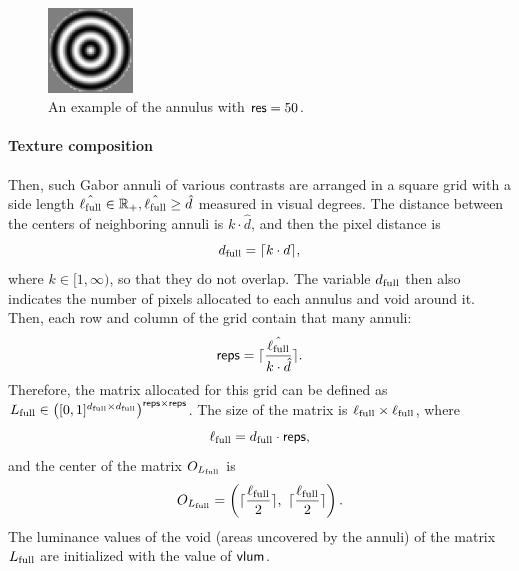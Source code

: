 \begin{figure}[!htp]
    \centering
    \includegraphics[width=0.2\textwidth]{assets/images/grating.png}
    \caption{An example of the annulus with $\mathsf{res} = 50$.}
    \label{fig:grating-example}
\end{figure}


\paragraph{Texture composition}

Then, such Gabor annuli of various contrasts are arranged in a square grid with a side length $\hat{\ell_{\mathrm{full}}} \in \mathbb{R}_+, \hat{\ell_{\mathrm{full}}} \geq \hat{d}$ measured in visual degrees. The distance between the centers of neighboring annuli is $k \cdot \hat{d}$, and then the pixel distance is 
\begin{equation}
    d_{\mathrm{full}} = \lceil k \cdot d\rceil,
\end{equation}
where $k \in [1, \infty)$, so that they do not overlap. The variable $d_{\mathrm{full}}$ then also indicates the number of pixels allocated to each annulus and void around it. Then, each row and column of the grid contain that many annuli:
\begin{equation}
    \mathsf{reps} = \lceil\frac{\hat{\ell_{\mathrm{full}}}}{k \cdot \hat{d}}\rceil.
\end{equation}
Therefore, the matrix allocated for this grid can be defined as $L_{\mathrm{full}} \in \left( [0, 1]^{ d_{\mathrm{full}} \times d_{\mathrm{full}}} \right)^{\mathsf{reps} \times \mathsf{reps}}$. The size of the matrix is $\ell_{\mathrm{full}} \times \ell_{\mathrm{full}}$, where 
\begin{equation}
    \ell_{\mathrm{full}} = d_{\mathrm{full}} \cdot \mathsf{reps},
\end{equation}
and the center of the matrix $O_{L_{\mathrm{full}}}$ is
\begin{equation}
    O_{L_{\mathrm{full}}} = \left( \lceil\frac{\ell_{\mathrm{full}}}{2}\rceil, \ \lceil\frac{\ell_{\mathrm{full}}}{2}\rceil \right).
\end{equation}
The luminance values of the void (areas uncovered by the annuli) of the matrix $L_{\mathrm{full}}$ are initialized with the value of $\mathsf{vlum}$. 

